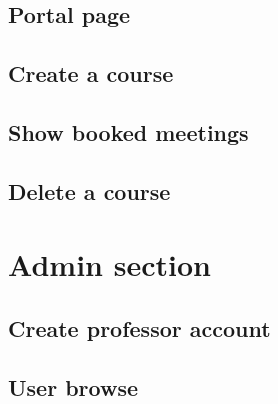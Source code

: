 \subsection{Portal page}

\newpage

\subsection{Create a course}

\newpage

\subsection{Show booked meetings}

\newpage

\subsection{Delete a course} 

\newpage


\section{Admin section}

\subsection{Create professor account}

\newpage

\subsection{User browse}

